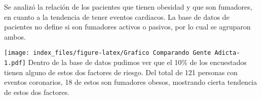 \documentclass[
]{article}
\begin{document}
Se analizó la relación de los pacientes que tienen obesidad y que son
fumadores, en cuanto a la tendencia de tener eventos cardiacos. La base
de datos de pacientes no define si son fumadores activos o pasivos, por
lo cual se agruparon ambos.

\texttt{[image: index\_files/figure-latex/Grafico Comparando Gente Adicta-1.pdf]}
Dentro de la base de datos pudimos ver que el 10\% de los encuestados
tienen alguno de estos dos factores de riesgo. Del total de 121 personas
con eventos coronarios, 18 de estos son fumadores obesos, mostrando
cierta tendencia de estos dos factores.
\end{document}

